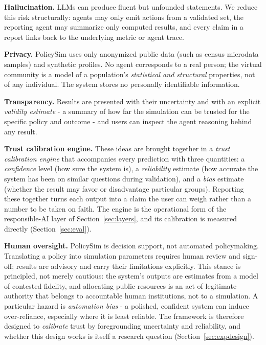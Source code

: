 \documentclass[conference]{IEEEtran}
\begin{document}
\textbf{Hallucination.} LLMs can produce fluent but unfounded statements. We reduce this risk structurally: agents may only emit actions from a validated set, the reporting agent may summarize only computed results, and every claim in a report links back to the underlying metric or agent trace.

\textbf{Privacy.} PolicySim uses only anonymized public data (such as census microdata samples) and synthetic profiles. No agent corresponds to a real person; the virtual community is a model of a population's \emph{statistical and structural} properties, not of any individual. The system stores no personally identifiable information.

\textbf{Transparency.} Results are presented with their uncertainty and with an explicit \emph{validity estimate} - a summary of how far the simulation can be trusted for the specific policy and outcome - and users can inspect the agent reasoning behind any result.

\textbf{Trust calibration engine.} These ideas are brought together in a \emph{trust calibration engine} that accompanies every prediction with three quantities: a \emph{confidence} level (how sure the system is), a \emph{reliability} estimate (how accurate the system has been on similar questions during validation), and a \emph{bias} estimate (whether the result may favor or disadvantage particular groups). Reporting these together turns each output into a claim the user can weigh rather than a number to be taken on faith. The engine is the operational form of the responsible-AI layer of Section~\ref{sec:layers}, and its calibration is measured directly (Section~\ref{sec:eval}).

\textbf{Human oversight.} PolicySim is decision support, not automated policymaking. Translating a policy into simulation parameters requires human review and sign-off; results are advisory and carry their limitations explicitly. This stance is principled, not merely cautious: the system's outputs are estimates from a model of contested fidelity, and allocating public resources is an act of legitimate authority that belongs to accountable human institutions, not to a simulation. A particular hazard is \emph{automation bias} - a polished, confident system can induce over-reliance, especially where it is least reliable. The framework is therefore designed to \emph{calibrate} trust by foregrounding uncertainty and reliability, and whether this design works is itself a research question (Section~\ref{sec:expdesign}).
\end{document}

